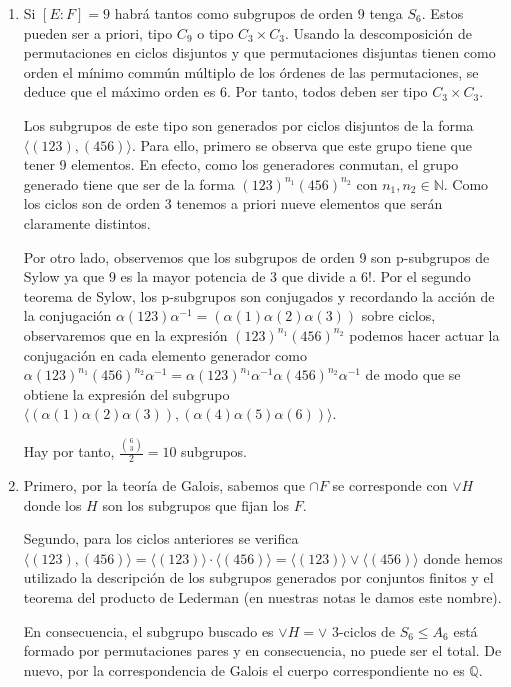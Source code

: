 \begin{enumerate}
\item Si $[E:F] = 9$ habrá tantos como subgrupos de orden 9 tenga $S_6$. Estos pueden ser a priori, tipo $C_9$ o tipo $C_3 \times C_3$. Usando la descomposición de permutaciones en ciclos disjuntos y que permutaciones disjuntas tienen como orden el mínimo commún múltiplo de los órdenes de las permutaciones, se deduce que el máximo orden es 6. Por tanto, todos deben ser tipo $C_3 \times C_3$. 

Los subgrupos de este tipo son generados por ciclos disjuntos de la forma $\langle (123),(456) \rangle$. Para ello, primero se observa que este grupo tiene que tener 9 elementos. En efecto, como los generadores conmutan, el grupo generado tiene que ser de la forma $(123)^{n_1} (456)^{n_2}$ con $n_1,n_2 \in \mathbb{N}$. Como los ciclos son de orden 3 tenemos a priori nueve elementos que serán claramente distintos. 

Por otro lado, observemos que los subgrupos de orden 9 son p-subgrupos de Sylow ya que 9 es la mayor potencia de 3 que divide a $6!$. Por el segundo teorema de Sylow, los p-subgrupos son conjugados y recordando la acción de la conjugación $\alpha (123) \alpha^{-1} = (\alpha(1)\alpha(2)\alpha(3))$ sobre ciclos, observaremos que en la expresión $(123)^{n_1} (456)^{n_2}$ podemos hacer actuar la conjugación en cada elemento generador como $\alpha(123)^{n_1} (456)^{n_2}\alpha^{-1} = \alpha(123)^{n_1}\alpha^{-1}\alpha(456)^{n_2}\alpha^{-1}$ de modo que se obtiene la expresión del subgrupo $\langle (\alpha(1)\alpha(2)\alpha(3)),(\alpha(4)\alpha(5)\alpha(6)) \rangle$. 

Hay por tanto, $\frac{\binom{6}{3}}{2} = 10$ subgrupos. 

\item Primero, por la teoría de Galois, sabemos que $\cap F$ se corresponde con $\lor H$ donde los $H$ son los subgrupos que fijan los $F$. 

Segundo, para los ciclos anteriores se verifica $\langle (123),(456) \rangle = \langle (123) \rangle \cdot \langle (456) \rangle = \langle (123) \rangle \lor \langle (456) \rangle$ donde hemos utilizado la descripción de los subgrupos generados por conjuntos finitos y el teorema del producto de Lederman (en nuestras notas le damos este nombre). 

En consecuencia, el subgrupo buscado es $\lor H = \lor \text{ 3-ciclos de } S_6 \le A_6$ está formado por permutaciones pares y en consecuencia, no puede ser el total. De nuevo, por la correspondencia de Galois el cuerpo correspondiente no es $\mathbb{Q}$.


\end{enumerate}
